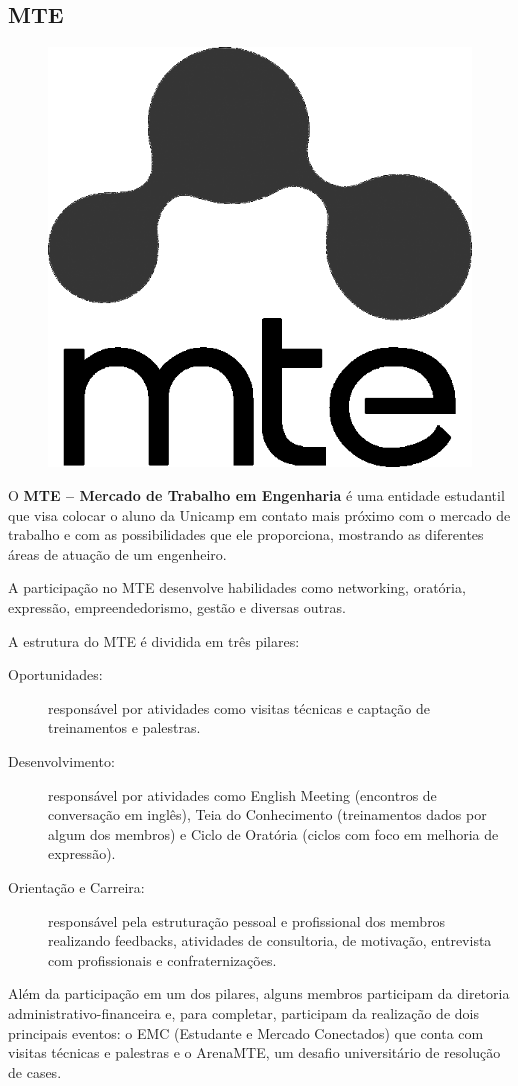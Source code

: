 \subsection{MTE}

\begin{figure}[h!]
    \centering
    \includegraphics[width=.35\textwidth]{img/alem_da_graduacao/mte_logo.png}
\end{figure}

O \textbf{MTE -- Mercado de Trabalho em Engenharia} é uma entidade estudantil
que visa colocar o aluno da Unicamp em contato mais próximo com o mercado de
trabalho e com as possibilidades que ele proporciona, mostrando as diferentes
áreas de atuação de um engenheiro.

A participação no MTE desenvolve habilidades como networking, oratória,
expressão, empreendedorismo, gestão e diversas outras.

A estrutura do MTE é dividida em três pilares:

\begin{description}
    \item[Oportunidades:] responsável por atividades como visitas técnicas e
        captação de treinamentos e palestras.

    \item[Desenvolvimento:] responsável por atividades como English Meeting
        (encontros de conversação em inglês), Teia do Conhecimento (treinamentos
        dados por algum dos membros) e Ciclo de Oratória (ciclos com foco em
        melhoria de expressão).

    \item[Orientação e Carreira:] responsável pela estruturação pessoal e
        profissional dos membros realizando feedbacks, atividades de
        consultoria, de motivação, entrevista com profissionais e
        confraternizações.
\end{description}

Além da participação em um dos pilares, alguns membros participam da diretoria
administrativo-financeira e, para completar, participam da realização de dois
principais eventos: o EMC (Estudante e Mercado Conectados) que conta com visitas
técnicas e palestras e o ArenaMTE, um desafio universitário de resolução de
cases.

